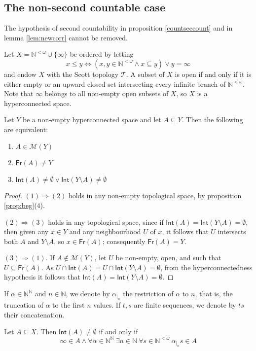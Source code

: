 \documentclass{lmcs}
\newcommand{\N}{\mathbb N}
\newcommand{\Bai}{\N^{\N}}
\newcommand{\Seq}{\N^{<\omega}}
\newcommand{\Int}[1]{\mathsf{Int}(#1)}
\newcommand{\Fr}[1]{\mathsf{Fr}(#1)}
\begin{document}
\subsection{The non-second countable case} \label{sec:nsc}
The hypothesis of second countability in proposition \ref{countseccount} and in lemma \ref{lem:newcorr} cannot be removed.

Let $X= \Seq \cup\{\infty\} $ be ordered by letting
\[
x\leqslant y\Leftrightarrow (x,y\in \Seq \land x\subseteq y)\lor y=\infty
\]
and endow $X$ with the Scott topology $ \mathcal T $.
A subset of $X$ is open if and only if it is either empty or an upward closed set intersecting every infinite branch of $ \Seq $.
Note that $\infty $ belongs to all non-empty open subsets of $X$, so $X$ is a hyperconnected space.

\begin{lem} \label{lem:hypc}
Let $Y$ be a non-empty hyperconnected space and let $A\subseteq Y$.
Then the following are equivalent:
\begin{enumerate}
\item $A\in \mathcal M (Y)$
\item $ \Fr{A} \ne Y$
\item $ \Int{A} \ne\emptyset\lor \Int{Y\setminus A} \ne \emptyset $
\end{enumerate}
\end{lem}

\begin{proof}
$(1)\Rightarrow (2)$ holds in any non-empty topological space, by proposition \ref{prop:beg}(4).

$(2)\Rightarrow (3)$ holds in any topological space, since if $ \Int{A} = \Int{Y\setminus A} =\emptyset $, then given any $x\in Y$ and any neighbourhood $U$ of $x$, it follows that $U$ intersects both $A$ and $Y\setminus A$, so $x\in \Fr{A} $; consequently $ \Fr{A} =Y$.

$(3)\Rightarrow (1)$.
If $A\notin \mathcal M (Y)$, let $U$ be non-empty, open, and such that $U\subseteq \Fr{A} $.
As $U\cap \Int{A} =U\cap \Int{Y\setminus A}=\emptyset $, from the hyperconnectedness hypothesis it follows that $ \Int{A} = \Int{Y\setminus A} =\emptyset $.
\end{proof}

If $\alpha\in \Bai $ and $n\in \N $, we denote by $\alpha_{|_n}$ the restriction of $\alpha $ to $n$, that is, the truncation of $\alpha $ to the first $n$ values.
If $t,s$ are finite sequences, we denote by $ts$ their concatenation.

\begin{lem} \label{lem:intnn}
Let $A\subseteq X$.
Then $ \Int{A} \ne\emptyset $ if and only if
\begin{equation} \label{eq:lemmaint}
\infty\in A\land\forall\alpha\in \Bai \ \exists n\in \N \ \forall s\in \Seq \ \alpha_{|_n}s\in A
\end{equation}
\end{lem}
\end{document}
